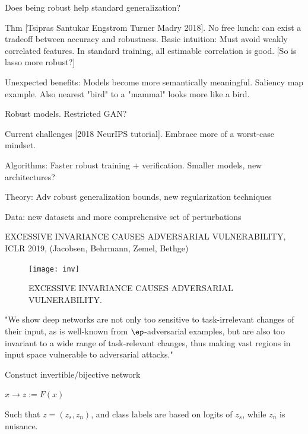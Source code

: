 \documentclass[english]{article}
\begin{document}
\item Does being robust help standard generalization? 


Thm [Tsipras Santukar Engstrom Turner Madry 2018]. No free lunch: can exist a tradeoff between accuracy and robustness. Basic intuition: Must avoid weakly correlated features. In standard training, all estimable correlation is good. [So is lasso more robust?]

\item Unexpected benefits: Models become more semantically meaningful. Saliency map example. Also nearest "bird" to a "mammal" looks more like a bird. 

Robust models. Restricted GAN?


\eenum
\item Current challenges [2018 NeurIPS tutorial]. Embrace more of a worst-case mindset.


\benum 
\item Algorithms: Faster robust training + verification. Smaller models, new architectures?

\item Theory: Adv robust generalization bounds, new regularization techniques

\item Data: new datasets and more comprehensive set of perturbations

\eenum

\item EXCESSIVE INVARIANCE CAUSES ADVERSARIAL
VULNERABILITY, ICLR 2019, (Jacobsen, Behrmann, Zemel, Bethge)

  \begin{figure}
        \centering
        \texttt{[image: inv]}
        
        \caption{EXCESSIVE INVARIANCE CAUSES ADVERSARIAL
VULNERABILITY.}
        \label{inv}
    \end{figure}


"We show
deep networks are not only too sensitive to task-irrelevant changes of their input,
as is well-known from $\ep$-adversarial examples, but are also too invariant to a wide
range of task-relevant changes, thus making vast regions in input space vulnerable
to adversarial attacks."


Constuct invertible/bijective network 

$x\to z:=F(x)$

Such that $z=(z_s,z_n)$, and class labels are based on logits of $z_s$, while $z_n$ is nuisance. 
\end{document}
